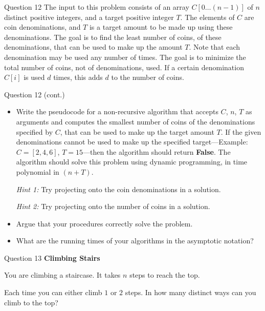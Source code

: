 \documentclass{beamer}
\begin{document}
\begin{frame}{Question 12}
The input to this problem consists of an array $C[0\ldots(n-1)]$ of $n$ distinct positive integers, and a target positive integer $T$. The elements of $C$ are coin denominations, and $T$ is a target amount to be made up using these denominations. The goal is to find the least number of coins, of these denominations, that can be used to make up the amount $T$. Note that each denomination may be used any number of times. The goal is to minimize the total number of coins, not of denominations, used. If a certain denomination $C[i]$ is used $d$ times, this adds $d$ to the number of coins.
\end{frame}

\begin{frame}{Question 12 (cont.)}
  \begin{itemize}
  \item[(a)] Write the pseudocode for a non-recursive algorithm that accepts $C$, $n$, $T$ as arguments and computes the smallest number of coins of the denominations specified by $C$, that can be used to make up the target amount $T$. If the given denominations cannot be used to make up the specified target---Example: $C = [2, 4, 6]$, $T = 15$---then the algorithm should return \textbf{False}. The algorithm should solve this problem using dynamic programming, in time polynomial in $(n + T)$.

  \textit{Hint 1:} Try projecting onto the coin denominations in a solution.

  \textit{Hint 2:} Try projecting onto the number of coins in a solution.

  \item[(b)] Argue that your procedures correctly solve the problem.

  \item[(c)] What are the running times of your algorithms in the asymptotic notation?
\end{itemize}
\end{frame}
\begin{frame}{}
\end{frame}

\begin{frame}{Question 13}
\textbf{Climbing Stairs}

You are climbing a staircase. It takes $n$ steps to reach the top.

Each time you can either climb $1$ or $2$ steps. In how many distinct ways can you climb to the top?
\end{frame}
\end{document}
